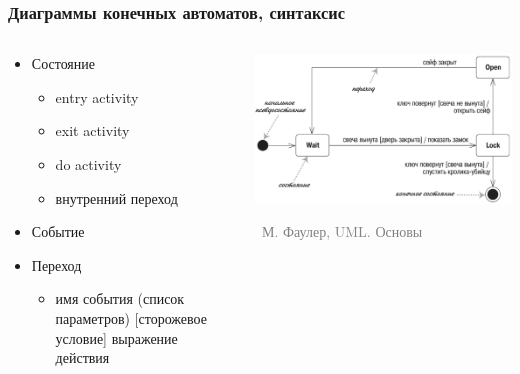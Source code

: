\documentclass[xetex,mathserif,serif]{beamer}
\newcommand{\attribution}[1] {
    \vspace{-5mm}\begin{flushright}\begin{scriptsize}\textcolor{gray}{\textcopyright\, #1}\end{scriptsize}\end{flushright}
}
\begin{document}
    \begin{frame}
        \frametitle{Диаграммы конечных автоматов, синтаксис}
        \begin{columns}
            \begin{column}{0.5\textwidth}
                \begin{itemize}
                    \item Состояние
                    \begin{itemize}
                        \item entry activity
                        \item exit activity
                        \item do activity
                        \item внутренний переход
                    \end{itemize}
                    \item Событие
                    \item Переход
                    \begin{itemize}
                        \item имя события (список параметров) [сторожевое условие] выражение действия
                    \end{itemize}
                \end{itemize}
            \end{column}
            \begin{column}{0.5\textwidth}
                \begin{center}
                    \includegraphics[width=\textwidth]{stateTransitionSyntax.png}
                    \attribution{М. Фаулер, UML. Основы}
                \end{center}
            \end{column}
        \end{columns}
    \end{frame}
\end{document}
